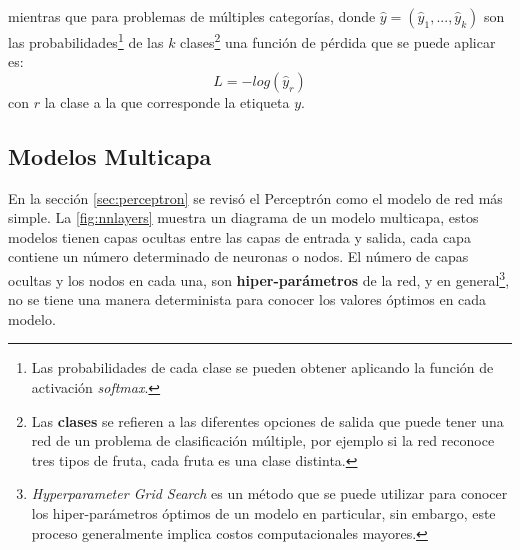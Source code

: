mientras que para problemas de múltiples categorías, donde $\hat{y}=(\hat{y}_1, ..., \hat{y}_k)$ son las probabilidades\footnote{Las probabilidades de cada clase se pueden obtener aplicando la función de activación \emph{softmax}.} de las $k$ clases\footnote{Las \textbf{clases} se refieren a las diferentes opciones de salida que puede tener una red de un problema de clasificación múltiple, por ejemplo si la red reconoce tres tipos de fruta, cada fruta es una clase distinta.} una función de pérdida que se puede aplicar es:
\begin{equation}
  \label{eq:otro}
  L = −log(\hat{y}_r)
\end{equation}
con $r$ la clase a la que corresponde la etiqueta $y$.

\subsection{Modelos Multicapa}\label{sec:multicapamodels}
En la sección \autoref{sec:perceptron} se revisó el Perceptrón como el modelo de red más simple. La \autoref{fig:nnlayers} muestra un diagrama de un modelo multicapa, estos modelos tienen capas ocultas entre las capas de entrada y salida, cada capa contiene un número determinado de neuronas o nodos. El número de capas ocultas y los nodos en cada una, son \textbf{hiper-parámetros} de la red, y en general\footnote{\emph{Hyperparameter Grid Search} es un método que se puede utilizar para conocer los hiper-parámetros óptimos de un modelo en particular, sin embargo, este proceso generalmente implica costos computacionales mayores.}, no se tiene una manera determinista para conocer los valores óptimos en cada modelo.

